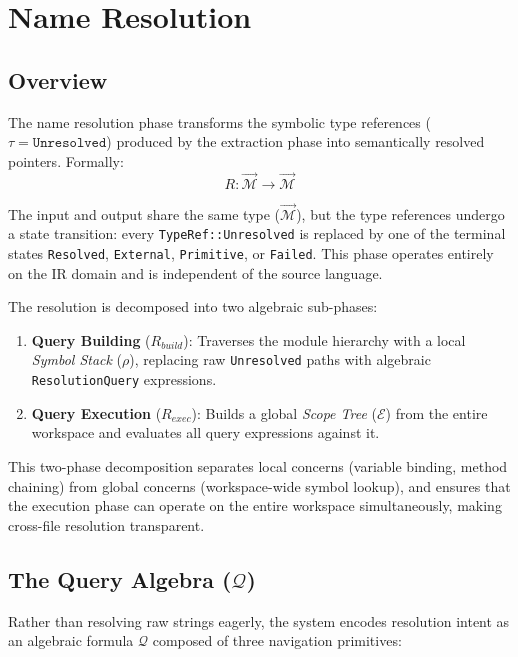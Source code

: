 \chapter{Name Resolution}
\label{ch:name_resolution}

\section{Overview}
\label{sec:resolution_overview}

The name resolution phase transforms the symbolic type references
($\tau = \texttt{Unresolved}$) produced by the extraction phase into
semantically resolved pointers. Formally:
$$R : \vec{\mathcal{M}} \to \vec{\mathcal{M}}$$

The input and output share the same type ($\vec{\mathcal{M}}$), but
the type references undergo a state transition: every
\texttt{TypeRef::Unresolved} is replaced by one of the terminal
states \texttt{Resolved}, \texttt{External}, \texttt{Primitive}, or
\texttt{Failed}. This phase operates entirely on the IR domain and is
independent of the source language.

The resolution is decomposed into two algebraic sub-phases:
\begin{enumerate}
  \item \textbf{Query Building} ($R_{build}$): Traverses the module
    hierarchy with a local \textit{Symbol Stack} ($\rho$), replacing
    raw \texttt{Unresolved} paths with algebraic
    \texttt{ResolutionQuery} expressions.
  \item \textbf{Query Execution} ($R_{exec}$): Builds a global
    \textit{Scope Tree} ($\mathcal{E}$) from the entire workspace and
    evaluates all query expressions against it.
\end{enumerate}

This two-phase decomposition separates local concerns (variable
binding, method chaining) from global concerns (workspace-wide symbol
lookup), and ensures that the execution phase can operate on the
entire workspace simultaneously, making cross-file resolution transparent.

\section{The Query Algebra ($\mathcal{Q}$)}
\label{sec:query_algebra}

Rather than resolving raw strings eagerly, the system encodes
resolution intent as an algebraic formula $\mathcal{Q}$ composed of
three navigation primitives:


